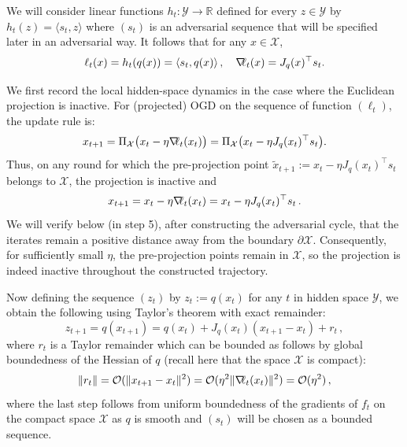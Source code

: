 \documentclass[a4paper,11pt,fullpage]{article}
\def\Y{{\mathcal Y}}
\theoremstyle{plain}
\theoremstyle{definition}
\theoremstyle{plain}
\let\nablaold\nabla
\renewcommand{\nabla}{\nablaold\mkern-2.5mu}
\begin{document}
We will consider linear functions $h_t: \Y \to \mathbb{R}$ defined for every $z \in \Y$ by $h_t(z) = \langle s_t, z \rangle$ where $(s_t)$ is an adversarial sequence that will be specified later in an adversarial way. It follows that for any $x \in \mathcal{X}$, 
\begin{equation*}
\ell_t(x) = h_t(q(x)) = \langle s_t, q(x) \rangle\,, \quad \nabla \ell_t(x) = J_q(x)^{\top} s_t. 
\end{equation*}

We first record the local hidden-space dynamics in the case where the Euclidean projection is inactive. For (projected) OGD on the sequence of function $(\ell_t)$, the update rule is:
\begin{equation*}
x_{t+1}
= \Pi_{\mathcal X}\bigl(x_t-\eta \nabla \ell_t(x_t) \bigr) = 
\Pi_{\mathcal X}\bigl(x_t-\eta J_q(x_t)^\top s_t\bigr).
\end{equation*}
Thus, on any round for which the pre-projection point $\widetilde x_{t+1}:=x_t-\eta J_q(x_t)^\top s_t$
belongs to $\mathcal X$, the projection is inactive and
\begin{equation}
\label{eq:ogd-update-x}
x_{t+1} = x_t - \eta \nabla \ell_t(x_t) = x_t - \eta J_q(x_t)^{\top} s_t\,.
\end{equation}
We will verify below (in step 5), after constructing the adversarial cycle, that the iterates remain
a positive distance away from the boundary $\partial\mathcal X$. Consequently, for sufficiently small
$\eta$, the pre-projection points remain in $\mathcal X$, so the projection is indeed inactive throughout the constructed trajectory.

Now defining the sequence $(z_t)$ by $z_t := q(x_t)$ for any $t$ in hidden space $\Y$, we obtain the following using Taylor's theorem with exact remainder: 
\begin{equation}
\label{eq:1-taylor}
z_{t+1} = q(x_{t+1}) = q(x_t) + J_q(x_t) (x_{t+1} - x_t) + r_t\,,
\end{equation}
where $r_t$ is a Taylor remainder which can be bounded as follows by global boundedness of the Hessian of $q$ (recall here that the space $\mathcal{X}$ is compact): 
\begin{equation*}
\|r_t\| = \mathcal{O }(\|x_{t+1} -x_t\|^2) = \mathcal{O }( \eta^2 \|\nabla \ell_t(x_t)\|^2) =  \mathcal{O }( \eta^2)\,, 
\end{equation*}
where the last step follows from uniform boundedness of the gradients of $f_t$ on the compact space $\mathcal{X}$ as $q$ is smooth and $(s_t)$ will be chosen as a bounded sequence. 
\end{document}
